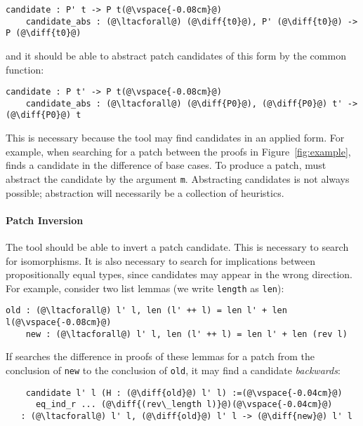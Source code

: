 \begin{lstlisting}[language=coq]
    candidate : P' t -> P t(@\vspace{-0.08cm}@)
    candidate_abs : (@\ltacforall@) (@\diff{t0}@), P' (@\diff{t0}@) -> P (@\diff{t0}@)
\end{lstlisting}
and it should be able to abstract patch candidates of this form by the common function:

\begin{lstlisting}[language=coq]
    candidate : P t' -> P t(@\vspace{-0.08cm}@)
    candidate_abs : (@\ltacforall@) (@\diff{P0}@), (@\diff{P0}@) t' -> (@\diff{P0}@) t
\end{lstlisting} 

This is necessary because the tool may find candidates in an applied form.
For example, when searching for a patch between the proofs in Figure~\ref{fig:example},
\sysname finds a candidate in the difference of base cases. To produce a patch, 
\sysname must abstract the candidate by the argument \lstinline{m}.
Abstracting candidates is not always possible; abstraction will necessarily be a collection of heuristics.

\paragraph{Patch Inversion} The tool should be able to invert a patch candidate.
This is necessary to search for isomorphisms. %
It is also necessary to search for implications between propositionally
equal types, since candidates may appear in the wrong direction.
For example, consider two list lemmas (we write \lstinline{length} as \lstinline{len}):

\begin{lstlisting}[language=coq]
    old : (@\ltacforall@) l' l, len (l' ++ l) = len l' + len l(@\vspace{-0.08cm}@)
    new : (@\ltacforall@) l' l, len (l' ++ l) = len l' + len (rev l)
\end{lstlisting} 

If \sysname searches the difference in proofs of these lemmas for a patch from the 
conclusion of \lstinline{new} to the conclusion of \lstinline{old},
it may find a candidate \emph{backwards}: %

\begin{lstlisting}
    candidate l' l (H : (@\diff{old}@) l' l) :=(@\vspace{-0.04cm}@)
      eq_ind_r ... (@\diff{(rev\_length l)}@)(@\vspace{-0.04cm}@)
   : (@\ltacforall@) l' l, (@\diff{old}@) l' l -> (@\diff{new}@) l' l
\end{lstlisting}

